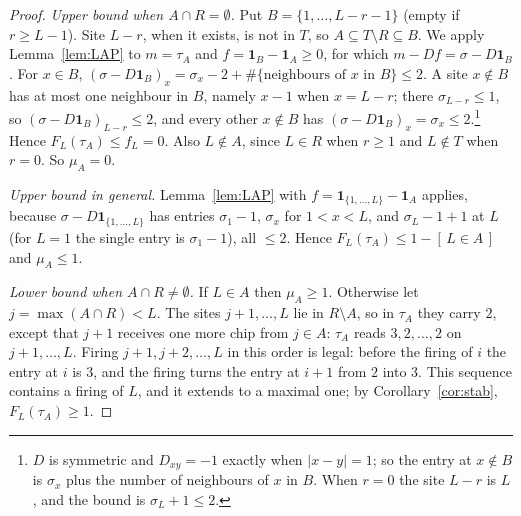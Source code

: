 \documentclass[11pt]{amsart}
\theoremstyle{definition}
\theoremstyle{remark}
\newcommand{\Ind}[1]{[\,#1\,]}
\begin{document}
\begin{proof}
\emph{Upper bound when $A\cap R=\emptyset$.} Put $B=\{1,\dots,L-r-1\}$ (empty if $r\ge L-1$). Site $L-r$, when it exists, is not in $T$, so $A\subseteq T\setminus R\subseteq B$. We apply Lemma~\ref{lem:LAP} to $m=\tau_A$ and $f=\mathbf 1_B-\mathbf 1_A\ge0$, for which $m-Df=\sigma-D\mathbf 1_B$. For $x\in B$, $(\sigma-D\mathbf 1_B)_x=\sigma_x-2+\#\{\text{neighbours of }x\text{ in }B\}\le2$. A site $x\notin B$ has at most one neighbour in $B$, namely $x-1$ when $x=L-r$; there $\sigma_{L-r}\le1$, so $(\sigma-D\mathbf 1_B)_{L-r}\le2$, and every other $x\notin B$ has $(\sigma-D\mathbf 1_B)_x=\sigma_x\le2$.\footnote{$D$ is symmetric and $D_{xy}=-1$ exactly when $|x-y|=1$; so the entry at $x\notin B$ is $\sigma_x$ plus the number of neighbours of $x$ in $B$. When $r=0$ the site $L-r$ is $L$, and the bound is $\sigma_L+1\le2$.} Hence $F_L(\tau_A)\le f_L=0$. Also $L\notin A$, since $L\in R$ when $r\ge1$ and $L\notin T$ when $r=0$. So $\mu_A=0$.

\emph{Upper bound in general.} Lemma~\ref{lem:LAP} with $f=\mathbf 1_{\{1,\dots,L\}}-\mathbf 1_A$ applies, because $\sigma-D\mathbf 1_{\{1,\dots,L\}}$ has entries $\sigma_1-1$, $\sigma_x$ for $1<x<L$, and $\sigma_L-1+1$ at $L$ (for $L=1$ the single entry is $\sigma_1-1$), all $\le2$. Hence $F_L(\tau_A)\le1-\Ind{L\in A}$ and $\mu_A\le1$.

\emph{Lower bound when $A\cap R\ne\emptyset$.} If $L\in A$ then $\mu_A\ge1$. Otherwise let $j=\max(A\cap R)<L$. The sites $j+1,\dots,L$ lie in $R\setminus A$, so in $\tau_A$ they carry $2$, except that $j+1$ receives one more chip from $j\in A$: $\tau_A$ reads $3,2,\dots,2$ on $j+1,\dots,L$. Firing $j+1,j+2,\dots,L$ in this order is legal: before the firing of $i$ the entry at $i$ is $3$, and the firing turns the entry at $i+1$ from $2$ into $3$. This sequence contains a firing of $L$, and it extends to a maximal one; by Corollary~\ref{cor:stab}, $F_L(\tau_A)\ge1$.
\end{proof}
\end{document}
